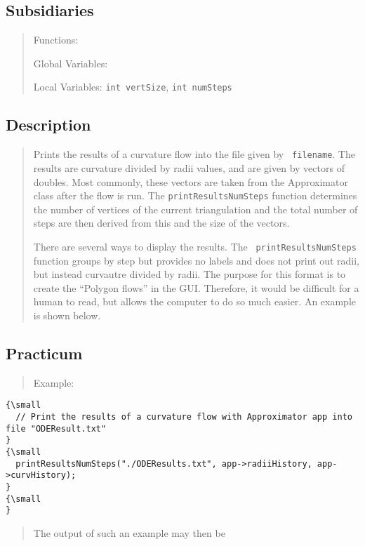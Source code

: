 \subsection*{Subsidiaries}

\begin{quotation}
Functions:

Global Variables:

Local Variables: \texttt{int vertSize}, \texttt{int numSteps}
\end{quotation}

\subsection*{Description}

\begin{quotation}
Prints the results of a curvature flow into the file given by \texttt{%
filename}. The results are curvature divided by radii values, and are given
by vectors of doubles. Most commonly, these vectors are taken from the
Approximator class after the flow is run. The \texttt{printResultsNumSteps}
function determines the number of vertices of the current triangulation and
the total number of steps are then derived from this and the size of the
vectors.

There are several ways to display the results. The \texttt{%
printResultsNumSteps} function groups by step but provides no labels and
does not print out radii, but instead curvautre divided by radii. The
purpose for this format is to create the ``Polygon flows'' in the GUI.
Therefore, it would be difficult for a human to read, but allows the
computer to do so much easier. An example is shown below.
\end{quotation}

\subsection*{Practicum}

\begin{quotation}
Example:{\small }
\end{quotation}

\begin{verbatim}
{\small 
  // Print the results of a curvature flow with Approximator app into file "ODEResult.txt"
}
{\small 
  printResultsNumSteps("./ODEResults.txt", app->radiiHistory, app->curvHistory);
}
{\small   
}
\end{verbatim}

\begin{quotation}
The output of such an example may then be{\small }
\end{quotation}

